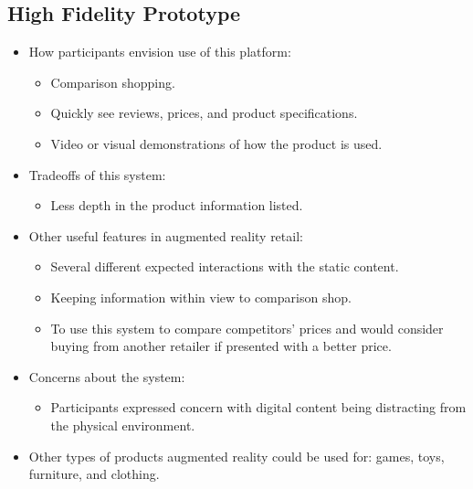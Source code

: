 \documentclass{sigchi-ext}
\begin{document}
\subsection{High Fidelity Prototype}
\begin{itemize}
	\item How participants envision use of this platform:
	\begin{itemize} \compresslist%
		\item Comparison shopping.
		\item Quickly see reviews, prices, and product specifications.
		\item Video or visual demonstrations of how the product is used.
	\end{itemize}
	\item Tradeoffs of this system:
		\begin{itemize} \compresslist%
			\item Less depth in the product information listed.
		\end{itemize}
	\item Other useful features in augmented reality retail:
	\begin{itemize} \compresslist%
		\item Several different expected interactions with the static content.
		\item Keeping information within view to comparison shop.
		\item To use this system to compare competitors' prices and would consider buying from another retailer if presented with a better price.
	\end{itemize}
	\item Concerns about the system:
	\begin{itemize} \compresslist%
		\item Participants expressed concern with digital content being distracting from the physical environment.
	\end{itemize}
	\item Other types of products augmented reality could be used for: games, toys, furniture, and clothing.
\end{itemize}
\end{document}
